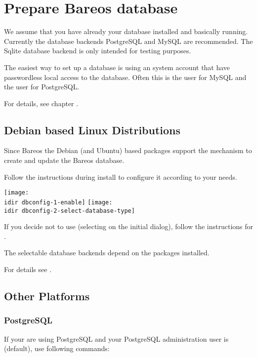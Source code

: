 \section{Prepare Bareos database}
    \label{sec:CreateDatabase}

We assume that you have already your database installed and basically running.
Currently the database backends PostgreSQL and MySQL are recommended. The Sqlite database backend is only intended for testing purposes.

The easiest way to set up a database is using an system account that have passwordless local access to the database. 
Often this is the user  for MySQL and the user  for PostgreSQL.

For details, see chapter .

\subsection{Debian based Linux Distributions}

Since Bareos  the Debian (and Ubuntu) based packages support the  mechanism to create and update the Bareos database.

Follow the instructions during install to configure it according to your needs.

\begin{center}
\texttt{[image: \\idir dbconfig-1-enable]}
\texttt{[image: \\idir dbconfig-2-select-database-type]}
\end{center}

If you decide not to use  (selecting  on the initial dialog), 
follow the instructions for .

The selectable database backends depend on the  packages installed.

For details see .

\subsection{Other Platforms}
    \label{sec:CreateDatabaseOtherDistributions}

\subsubsection{PostgreSQL}
If your are using PostgreSQL and your PostgreSQL administration user is  (default), use following commands:

